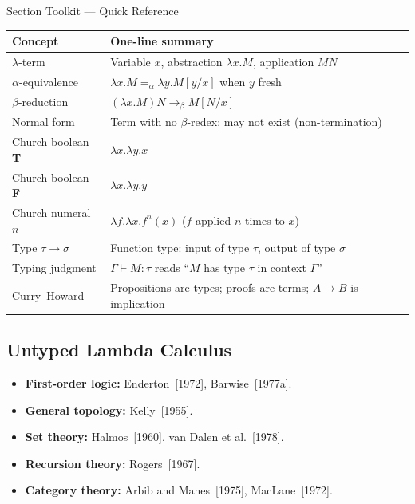 
\begin{toolkitbox}{Section Toolkit --- Quick Reference}
\small
\begin{tabular}{l l}
\toprule
\textbf{Concept} & \textbf{One-line summary} \\
\midrule
$\lambda$-term
  & Variable $x$, abstraction $\lambda x.M$, application $MN$ \\
$\alpha$-equivalence
  & $\lambda x.M =_\alpha \lambda y.M[y/x]$ when $y$ fresh \\
$\beta$-reduction
  & $(\lambda x.M)N \to_\beta M[N/x]$ \\
Normal form
  & Term with no $\beta$-redex; may not exist (non-termination) \\
Church boolean \textbf{T}
  & $\lambda x.\lambda y.x$ \\
Church boolean \textbf{F}
  & $\lambda x.\lambda y.y$ \\
Church numeral $\overline{n}$
  & $\lambda f.\lambda x.f^n(x)$ ($f$ applied $n$ times to $x$) \\
Type $\tau \to \sigma$
  & Function type: input of type $\tau$, output of type $\sigma$ \\
Typing judgment
  & $\Gamma\vdash M : \tau$ reads ``$M$ has type $\tau$ in context $\Gamma$'' \\
Curry--Howard
  & Propositions are types; proofs are terms; $A\to B$ is implication \\
\bottomrule
\end{tabular}
\end{toolkitbox}





\subsection*{Untyped Lambda Calculus}
\begin{tcolorbox}[title={Background References}]
\begin{itemize}
  \item \textbf{First-order logic:} Enderton~[1972], Barwise~[1977a].
  \item \textbf{General topology:} Kelly~[1955].
  \item \textbf{Set theory:} Halmos~[1960], van Dalen et al.~[1978].
  \item \textbf{Recursion theory:} Rogers~[1967].
  \item \textbf{Category theory:} Arbib and Manes~[1975], MacLane~[1972].
\end{itemize}
\end{tcolorbox}




